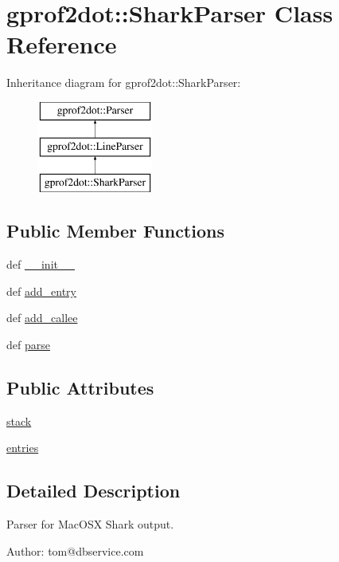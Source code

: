 \hypertarget{classgprof2dot_1_1SharkParser}{
\section{gprof2dot::SharkParser Class Reference}
\label{classgprof2dot_1_1SharkParser}
}
Inheritance diagram for gprof2dot::SharkParser:\begin{figure}[H]
\begin{center}
\leavevmode
\includegraphics[height=3.000000cm]{classgprof2dot_1_1SharkParser}
\end{center}
\end{figure}
\subsection*{Public Member Functions}
\begin{DoxyCompactItemize}
\item 
def \hyperlink{classgprof2dot_1_1SharkParser_a763ed5b299f10d9a053462c99a074368}{\_\-\_\-init\_\-\_\-}
\item 
def \hyperlink{classgprof2dot_1_1SharkParser_a02ed27edea9d48d328db52b06d478991}{add\_\-entry}
\item 
def \hyperlink{classgprof2dot_1_1SharkParser_afc502a494e97444de1b0b79e4bbde1cb}{add\_\-callee}
\item 
def \hyperlink{classgprof2dot_1_1SharkParser_a50aedd037118d47393d3c8afe915be75}{parse}
\end{DoxyCompactItemize}
\subsection*{Public Attributes}
\begin{DoxyCompactItemize}
\item 
\hyperlink{classgprof2dot_1_1SharkParser_a3e10513646241304ce5208017eed21d4}{stack}
\item 
\hyperlink{classgprof2dot_1_1SharkParser_add53c92f98ac5751eba4bc9586fefb6c}{entries}
\end{DoxyCompactItemize}


\subsection{Detailed Description}
\begin{DoxyVerb}Parser for MacOSX Shark output.

Author: tom@dbservice.com
\end{DoxyVerb}
 


